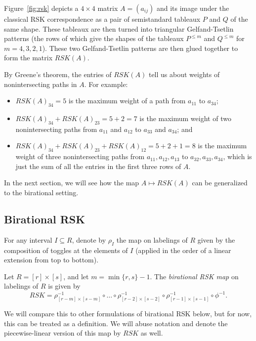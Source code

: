 \documentclass[ALCO,Unicode,published]{cedram}
\numberwithin{equation}{section}
\begin{document}
\begin{Ex}\label{ex:rsk}
    Figure~\ref{fig:rsk} depicts a $4 \times 4$ matrix $A=(a_{ij})$ and its image under the classical RSK correspondence as a pair of semistandard tableaux $P$ and $Q$ of the same shape. These tableaux are then turned into triangular Gelfand-Tsetlin patterns (the rows of which give the shapes of the tableaux $P^{\leq m}$ and $Q^{\leq m}$ for $m=4, 3, 2, 1$). These two Gelfand-Tsetlin patterns are then glued together to form the matrix $RSK(A)$.

    By Greene's theorem, the entries of $RSK(A)$ tell us about weights of nonintersecting paths in $A$. For example:
    \begin{itemize}
    \item $RSK(A)_{34} = 5$ is the maximum weight of a path from $a_{11}$ to $a_{34}$; 
    \item $RSK(A)_{34}+RSK(A)_{23} = 5+2 = 7$ is the maximum weight of two nonintersecting paths from $a_{11}$ and $a_{12}$ to $a_{33}$ and $a_{34}$; and
    \item $RSK(A)_{34}+RSK(A)_{23}+RSK(A)_{12} = 5+2+1 = 8$ is the maximum weight of three nonintersecting paths from $a_{11}, a_{12}, a_{13}$ to $a_{32}, a_{33}, a_{34}$, which is just the sum of all the entries in the first three rows of $A$.
    \end{itemize}
\end{Ex}

In the next section, we will see how the map $A \mapsto RSK(A)$ can be generalized to the birational setting.

\subsection{Birational RSK}

For any interval $I \subseteq R$, denote by $\rho_I$ the map on labelings of $R$ given by the composition of toggles at the elements of $I$ (applied in the order of a linear extension from top to bottom).

\begin{Def} \label{def:rsk}
Let $R = [r] \times [s]$, and let $m = \min\{r,s\}-1$. The \emph{birational RSK map} on labelings of $R$ is given by
\[RSK = \rho_{[r-m]\times[s-m]}^{-1} \circ \dots \circ \rho_{[r-2] \times [s-2]}^{-1} \circ \rho_{[r-1] \times [s-1]}^{-1} \circ \phi^{-1}.\]
\end{Def}

We will compare this to other formulations of birational RSK below, but for now, this can be treated as a definition. We will abuse notation and denote the piecewise-linear version of this map by $RSK$ as well.
\end{document}
